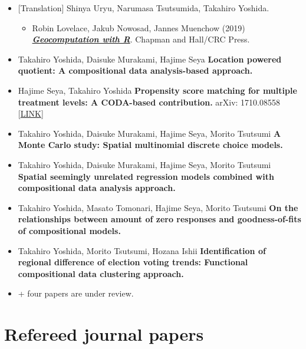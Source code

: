 \documentclass[
]{book}
\providecommand{\tightlist}{%
  \setlength{\itemsep}{0pt}\setlength{\parskip}{0pt}}
\begin{document}
\begin{itemize}
\tightlist
\item
  {[}Translation{]} Shinya Uryu, Narumasa Tsutsumida, Takahiro Yoshida.

  \begin{itemize}
  \tightlist
  \item
    Robin Lovelace, Jakub Nowosad, Jannes Muenchow (2019)
    \textbf{\emph{\href{https://geocompr.robinlovelace.net/}{Geocomputation with R}}}. Chapman and Hall/CRC Press.
  \end{itemize}
\item
  Takahiro Yoshida, Daisuke Murakami, Hajime Seya
  \textbf{Location powered quotient: A compositional data analysis-based approach.}
\item
  Hajime Seya, Takahiro Yoshida
  \textbf{Propensity score matching for multiple treatment levels: A CODA-based contribution.}
  arXiv: 1710.08558 {[}\href{https://arxiv.org/abs/1710.08558}{LINK}{]}
\item
  Takahiro Yoshida, Daisuke Murakami, Hajime Seya, Morito Tsutsumi
  \textbf{A Monte Carlo study: Spatial multinomial discrete choice models.}
\item
  Takahiro Yoshida, Daisuke Murakami, Hajime Seya, Morito Tsutsumi
  \textbf{Spatial seemingly unrelated regression models combined with compositional data analysis approach.}
\item
  Takahiro Yoshida, Masato Tomonari, Hajime Seya, Morito Tsutsumi
  \textbf{On the relationships between amount of zero responses and goodness-of-fits of compositional models.}
\item
  Takahiro Yoshida, Morito Tsutsumi, Hozana Ishii
  \textbf{Identification of regional difference of election voting trends: Functional compositional data clustering approach.}
\item
  + four papers are under review.
\end{itemize}

\section*{Refereed journal papers}\label{refereed-journal-papers}
\end{document}
